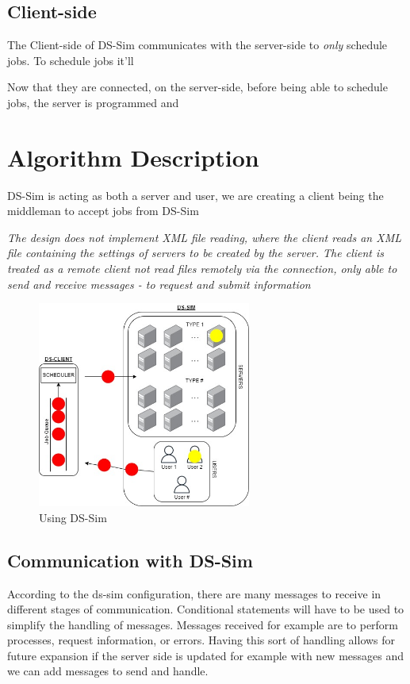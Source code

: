\documentclass[a4paper]{article} %
\begin{document}
\subsection*{Client-side}
The Client-side of DS-Sim communicates with the server-side to \textit{only} schedule jobs. To schedule jobs it'll 

\bigskip
Now that they are connected, on the server-side, before being able to schedule jobs, the server is programmed and 

\break
\section{Algorithm Description}
\label{sec:section3}
DS-Sim is acting as both a server and user, we are creating a client being the middleman to accept jobs from DS-Sim 

\medskip
\textit{The design does not implement XML file reading, where the client reads an XML file containing the settings of servers to be created by the server. The client is treated as a remote client not read files remotely via the connection, only able to send and receive messages - to request and submit information}

\begin{figure}[!h]
    \centering
    \includegraphics[width=7cm]{images/ds-serverANDclient diagram.jpg}
    \caption{Using DS-Sim}
    \label{fig:my_label}
\end{figure}

\subsection{Communication with DS-Sim}
According to the ds-sim configuration, there are many messages to receive in different stages of communication. Conditional statements will have to be used to simplify the handling of messages. Messages received for example are to perform processes, request information, or errors. Having this sort of handling allows for future expansion if the server side is updated for example with new messages and we can add messages to send and handle.
\end{document}
